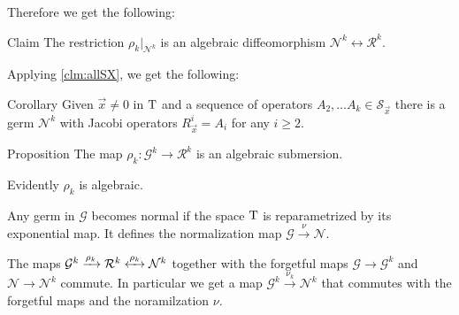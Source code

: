 \documentclass[a4paper,10pt]{article}
\begin{document}
Therefore we get the following:


\begin{thm}{Claim}\label{clm:diff}
The restriction $\rho_k|_{\mathcal{N}^k}$ is an algebraic diffeomorphism $\mathcal{N}^k\leftrightarrow\mathcal{R}^k$.
\end{thm}

Applying \ref{clm:allSX}, we get the following:

\begin{thm}{Corollary}\label{cor:Rall}
Given $\vec x\ne 0$ in $\mathrm{T}$ and a sequence of operators $A_2,\dots A_k\in \mathcal{S}_\vec x$ there is a germ $\mathcal{N}^k$ with Jacobi operators $R^i_\vec x=A_i$ for any $i\ge 2$.
\end{thm}

\begin{thm}{Proposition}\label{prop:submersion}
The map $\rho_k:\mathcal{G}^k\to \mathcal{R}^k$ is an algebraic submersion.
\end{thm}

\begin{wrapfigure}{r}{34mm}
\vskip-4mm
\centering
{}
\label{diagram-page}
\end{wrapfigure}

Evidently $\rho_k$ is algebraic.

Any germ in $\mathcal{G}$ becomes normal if the space $\mathrm{T}$ is reparametrized by its exponential map.
It defines the normalization map 
$\mathcal{G}\xrightarrow{\nu} \mathcal{N}$.

The maps $\mathcal{G}^k\xrightarrow{\rho_k}\mathcal{R}^k\z{\xleftrightarrow{\rho_k}}\mathcal{N}^k$ together with the forgetful maps $\mathcal{G}\to\mathcal{G}^k$ and $\mathcal{N}\to\mathcal{N}^k$  commute.
In particular we get a map $\mathcal{G}^k\xrightarrow{\nu_k}\mathcal{N}^k$ that commutes with the forgetful maps and the noramilzation $\nu$.
\end{document}
